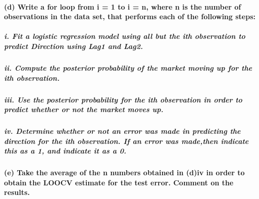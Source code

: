 \documentclass[
]{article}
\begin{document}
\paragraph{(d) Write a for loop from i = 1 to i = n, where n is the
number of observations in the data set, that performs each of the
following
steps:}\label{d-write-a-for-loop-from-i-1-to-i-n-where-n-is-the-number-of-observations-in-the-data-set-that-performs-each-of-the-following-steps}

\subparagraph{i. Fit a logistic regression model using all but the ith
observation to predict Direction using Lag1 and
Lag2.}\label{i.-fit-a-logistic-regression-model-using-all-but-the-ith-observation-to-predict-direction-using-lag1-and-lag2.}

\subparagraph{ii. Compute the posterior probability of the market moving
up for the ith
observation.}\label{ii.-compute-the-posterior-probability-of-the-market-moving-up-for-the-ith-observation.}

\subparagraph{iii. Use the posterior probability for the ith observation
in order to predict whether or not the market moves
up.}\label{iii.-use-the-posterior-probability-for-the-ith-observation-in-order-to-predict-whether-or-not-the-market-moves-up.}

\subparagraph{iv. Determine whether or not an error was made in
predicting the direction for the ith observation. If an error was
made,then indicate this as a 1, and indicate it as a
0.}\label{iv.-determine-whether-or-not-an-error-was-made-in-predicting-the-direction-for-the-ith-observation.-if-an-error-was-madethen-indicate-this-as-a-1-and-indicate-it-as-a-0.}

\paragraph{(e) Take the average of the n numbers obtained in (d)iv in
order to obtain the LOOCV estimate for the test error. Comment on the
results.}\label{e-take-the-average-of-the-n-numbers-obtained-in-div-in-order-to-obtain-the-loocv-estimate-for-the-test-error.-comment-on-the-results.}
\end{document}
